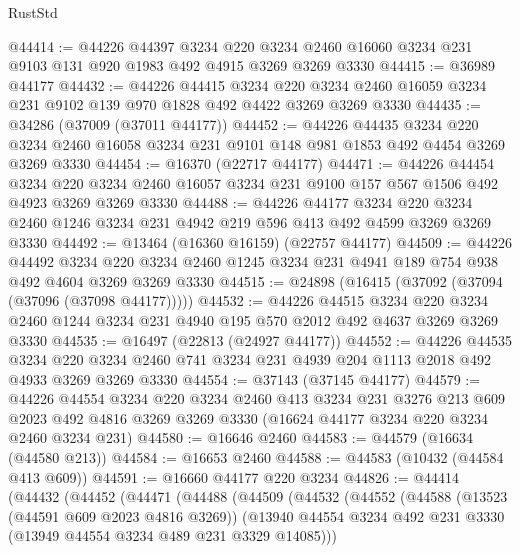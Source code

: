 \begin{lexlean}{RustStd}
\begin{coremodule}
@44414 := @44226
    @44397
    @3234
    @220
    @3234
    @2460
    @16060
    @3234
    @231
    @9103
    @131
    @920
    @1983
    @492
    @4915
    @3269
    @3269
    @3330
@44415 := @36989 @44177
@44432 := @44226
    @44415
    @3234
    @220
    @3234
    @2460
    @16059
    @3234
    @231
    @9102
    @139
    @970
    @1828
    @492
    @4422
    @3269
    @3269
    @3330
@44435 := @34286 (@37009 (@37011 @44177))
@44452 := @44226
    @44435
    @3234
    @220
    @3234
    @2460
    @16058
    @3234
    @231
    @9101
    @148
    @981
    @1853
    @492
    @4454
    @3269
    @3269
    @3330
@44454 := @16370 (@22717 @44177)
@44471 := @44226
    @44454
    @3234
    @220
    @3234
    @2460
    @16057
    @3234
    @231
    @9100
    @157
    @567
    @1506
    @492
    @4923
    @3269
    @3269
    @3330
@44488 := @44226
    @44177
    @3234
    @220
    @3234
    @2460
    @1246
    @3234
    @231
    @4942
    @219
    @596
    @413
    @492
    @4599
    @3269
    @3269
    @3330
@44492 := @13464 (@16360 @16159) (@22757 @44177)
@44509 := @44226
    @44492
    @3234
    @220
    @3234
    @2460
    @1245
    @3234
    @231
    @4941
    @189
    @754
    @938
    @492
    @4604
    @3269
    @3269
    @3330
@44515 := @24898 (@16415 (@37092 (@37094 (@37096 (@37098 @44177)))))
@44532 := @44226
    @44515
    @3234
    @220
    @3234
    @2460
    @1244
    @3234
    @231
    @4940
    @195
    @570
    @2012
    @492
    @4637
    @3269
    @3269
    @3330
@44535 := @16497 (@22813 (@24927 @44177))
@44552 := @44226
    @44535
    @3234
    @220
    @3234
    @2460
    @741
    @3234
    @231
    @4939
    @204
    @1113
    @2018
    @492
    @4933
    @3269
    @3269
    @3330
@44554 := @37143 (@37145 @44177)
@44579 := @44226
    @44554
    @3234
    @220
    @3234
    @2460
    @413
    @3234
    @231
    @3276
    @213
    @609
    @2023
    @492
    @4816
    @3269
    @3269
    @3330
    (@16624 @44177 @3234 @220 @3234 @2460 @3234 @231)
@44580 := @16646 @2460
@44583 := @44579 (@16634 (@44580 @213))
@44584 := @16653 @2460
@44588 := @44583 (@10432 (@44584 @413 @609))
@44591 := @16660 @44177 @220 @3234
@44826 := @44414
    (@44432
      (@44452
        (@44471
          (@44488
            (@44509
              (@44532
                (@44552
                  (@44588
                    (@13523 (@44591 @609 @2023 @4816 @3269))
                    (@13940
                      @44554
                      @3234
                      @492
                      @231
                      @3330
                      (@13949 @44554 @3234 @489 @231 @3329 @14085)))

\end{coremodule}
\end{lexlean}
